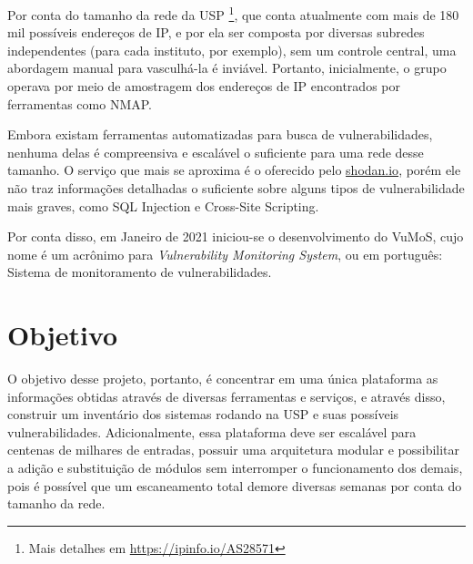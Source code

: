 Por conta do tamanho da rede da USP \footnote{Mais detalhes em \url{https://ipinfo.io/AS28571}}, 
que conta atualmente com mais de 180 mil possíveis endereços de IP,  e por ela ser composta por diversas subredes independentes (para cada instituto, por exemplo), sem um controle central, uma abordagem manual para vasculhá-la é inviável. Portanto, inicialmente, o grupo operava por meio de amostragem dos endereços de IP encontrados por ferramentas como NMAP. 


Embora existam ferramentas automatizadas para busca de vulnerabilidades, nenhuma delas é compreensiva e escalável o suficiente para uma rede desse tamanho. O serviço que mais se aproxima é o oferecido pelo 
\url{shodan.io},
porém ele não traz informações detalhadas o suficiente sobre alguns tipos de vulnerabilidade mais graves, como 
SQL Injection e Cross-Site Scripting. 

Por conta disso, em Janeiro de 2021 iniciou-se o desenvolvimento do VuMoS, cujo nome é um acrônimo para \textit{Vulnerability Monitoring System}, ou em português: Sistema de monitoramento de vulnerabilidades.



\section{Objetivo}

O objetivo desse projeto, portanto, é concentrar em uma única plataforma as informações obtidas através de diversas ferramentas e serviços, e através disso, construir um inventário dos sistemas rodando na USP e suas possíveis vulnerabilidades. Adicionalmente, essa plataforma deve ser escalável para centenas de milhares de entradas, possuir uma arquitetura modular e possibilitar a adição e substituição de módulos sem interromper o funcionamento dos demais, pois é possível que um escaneamento total demore diversas semanas por conta do tamanho da rede. 